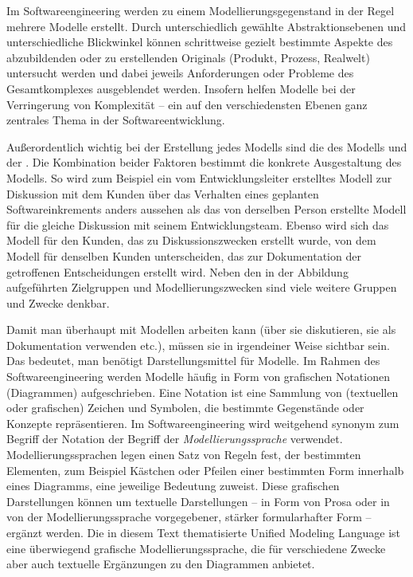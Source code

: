 Im Softwareengineering werden zu einem Modellierungsgegenstand in der Regel mehrere Modelle erstellt. Durch unterschiedlich gewählte Abstraktionsebenen und unter\-schied\-liche Blickwinkel können schrittweise gezielt bestimmte Aspekte des abzu\-bildenden oder zu erstellenden Originals (Produkt, Prozess, Realwelt) untersucht werden und dabei jeweils Anforderungen oder Probleme des Gesamtkomplexes ausgeblendet werden. Insofern helfen Modelle bei der Verringerung von Komplexität – ein auf den verschiedensten Ebenen ganz zentrales Thema in der Software\-entwicklung. 

Außerordentlich wichtig 
bei der Erstellung jedes Modells sind die
des Modells und der 
. Die Kombination beider Faktoren bestimmt die konkrete Ausgestaltung des Modells. So wird zum Beispiel ein vom Entwicklungsleiter erstelltes Modell zur Diskussion mit dem Kunden über das Verhalten eines geplanten Softwareinkrements anders aussehen als das von derselben Person erstellte Modell für die gleiche Diskussion mit seinem Entwicklungsteam. Ebenso wird sich das Modell für den Kunden, das zu Diskussionszwecken erstellt wurde, von dem Modell für denselben Kunden unterscheiden, das zur Dokumentation der getroffenen Entscheidungen erstellt wird. Neben den in der Abbildung aufgeführten Zielgruppen und Modellierungszwecken sind viele weitere Gruppen und Zwecke denkbar. 


\label{sec:Kap-3.1:Modelle_darstellen}
Damit man überhaupt mit Modellen arbeiten kann (über sie diskutieren, sie als Doku\-men\-ta\-tion verwenden etc.), müssen sie in irgendeiner Weise sichtbar sein. Das bedeutet, man benötigt Darstellungsmittel für Modelle. Im Rahmen des Softwareengineering werden Modelle häufig in Form von grafischen Notationen (Diagrammen) aufgeschrieben. Eine Notation ist eine Sammlung von (textuellen oder grafischen) Zeichen und Symbolen, die bestimmte Gegenstände oder Konzepte repräsentieren. Im Softwareengineering wird weitgehend synonym zum Begriff der Notation der Begriff der
\textit{Modellierungs\-sprache} verwendet. Modellierungssprachen legen einen Satz von Regeln fest, der bestimmten Elementen, zum Beispiel Kästchen oder \mbox{Pfeilen} einer bestimmten Form innerhalb eines Diagramms, eine jeweilige Bedeutung zuweist. Diese grafischen Darstellungen können um textuelle Darstellungen – in Form von Prosa oder in von der Modellierungssprache vorgegebener, stärker formularhafter Form – ergänzt werden. Die in diesem Text thematisierte Unified Modeling Language ist eine überwiegend grafische Modellierungssprache, die für verschiedene Zwecke aber auch textuelle Ergänzungen zu den Diagrammen anbietet. 

